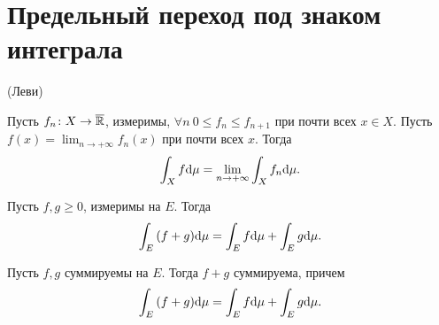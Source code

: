 \section{Предельный переход под знаком интеграла}

\begin{theorem}(Леви)

    Пусть $f_n \colon X \to \overline{\mathbb{R}}$, измеримы, $\forall n~ 0 \leqslant f_n \leqslant f_{n + 1}$
    при почти всех $x \in X$. Пусть $\displaystyle f(x) = \lim_{n \to +\infty}{f_n(x)}$ 
    при почти всех $x$. Тогда
\[
    \int_X{f \mathrm{d}\mu} = \lim_{n \to +\infty}{\int_X{f_n \mathrm{d}\mu}}
.\] 
\end{theorem}

\begin{theorem}

    Пусть $f, g \geqslant 0$, измеримы на $E$. Тогда
\[
    \int_E{(f + g) \mathrm{d}\mu} = \int_E{f \mathrm{d}\mu} + \int_E{g \mathrm{d}\mu}
.\] 
\end{theorem}

\begin{corollary}
    
    Пусть $f, g$ суммируемы на $E$. Тогда $f + g$ суммируема, причем
\[
    \int_E{(f + g) \mathrm{d}\mu} = \int_E{f \mathrm{d}\mu} + \int_E{g \mathrm{d}\mu}
.\]
\end{corollary}

